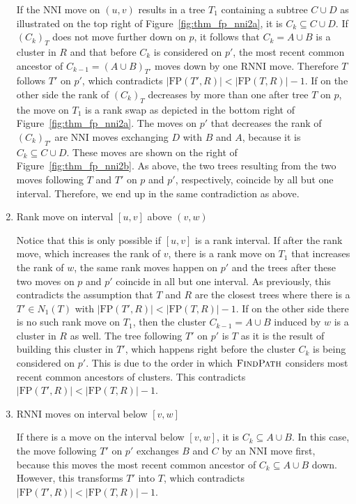 \documentclass{amsart}
\newcommand{\rnni}{\mathrm{RNNI}}
\newcommand{\findpath}{\textsc{FindPath}}
\newcommand{\nni}{\mathrm{NNI}}
\newcommand{\fp}{\mathrm{FP}}
\begin{document}
\begin{enumerate}[{Case} (1).]
If the $\nni$ move on $(u,v)$ results in a tree $T_1$ containing a subtree $C \cup D$ as illustrated on the top right of Figure~\ref{fig:thm_fp_nni2a}, it is $C_k \subseteq C \cup D$.
If $(C_k)_T$ does not move further down on $p$, it follows that $C_k = A \cup B$ is a cluster in $R$ and that before $C_k$ is considered on $p'$, the most recent common ancestor of $C_{k-1} = (A \cup B)_{T'}$ moves down by one $\rnni$ move.
Therefore $T$ follows $T'$ on $p'$, which contradicts $|\fp(T',R)| < |\fp(T,R)| - 1$.
If on the other side the rank of $(C_k)_T$ decreases by more than one after tree $T$ on $p$, the move on $T_1$ is a rank swap as depicted in the bottom right of Figure~\ref{fig:thm_fp_nni2a}.
The moves on $p'$ that decreases the rank of $(C_k)_{T'}$ are $\nni$ moves exchanging $D$ with $B$ and $A$, because it is $C_k \subseteq C \cup D$.
These moves are shown on the right of Figure~\ref{fig:thm_fp_nni2b}.
As above, the two trees resulting from the two moves following $T$ and $T'$ on $p$ and $p'$, respectively, coincide by all but one interval.
Therefore, we end up in the same contradiction as above.

\item Rank move on interval $[u,v]$ above $(v,w)$

Notice that this is only possible if $[u,v]$ is a rank interval.
If after the rank move, which increases the rank of $v$, there is a rank move on $T_1$ that increases the rank of $w$, the same rank moves happen on $p'$ and the trees after these two moves on $p$ and $p'$ coincide in all but one interval.
As previously, this contradicts the assumption that $T$ and $R$ are the closest trees where there is a $T' \in N_1(T)$ with $|\fp(T',R)| < |\fp(T,R)| - 1$.
If on the other side there is no such rank move on $T_1$, then the cluster $C_{k-1} = A \cup B$ induced by $w$ is a cluster in $R$ as well.
The tree following $T'$ on $p'$ is $T$ as it is the result of building this cluster in $T'$, which happens right before the cluster $C_k$ is being considered on $p'$.
This is due to the order in which $\findpath$ considers most recent common ancestors of clusters.
This contradicts $|\fp(T',R)| < |\fp(T,R)| - 1$.

\item $\rnni$ moves on interval below $[v,w]$

If there is a move on the interval below $[v,w]$, it is $C_k \subseteq A \cup B$.
In this case, the move following $T'$ on $p'$ exchanges $B$ and $C$ by an $\nni$ move first, because this moves the most recent common ancestor of $C_k \subseteq A \cup B$ down.
However, this transforms $T'$ into $T$, which contradicts $|\fp(T',R)| < |\fp(T,R)| - 1$.
\end{enumerate}
\end{document}
